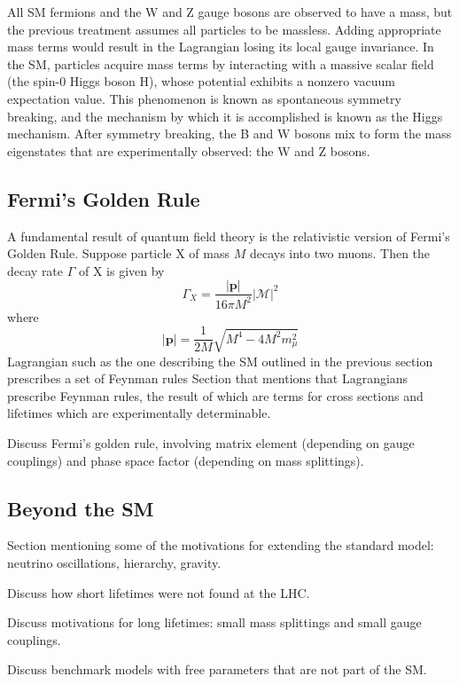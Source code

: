 All SM fermions and the W and Z gauge bosons are observed to have a mass, but the previous treatment assumes all particles to be massless.
Adding appropriate mass terms would result in the Lagrangian losing its local gauge invariance.
In the SM, particles acquire mass terms by interacting with a massive scalar field (the spin-0 Higgs boson H), whose potential exhibits a nonzero vacuum expectation value.
This phenomenon is known as spontaneous symmetry breaking, and the mechanism by which it is accomplished is known as the Higgs mechanism.
After symmetry breaking, the B and W bosons mix to form the mass eigenstates that are experimentally observed: the W and Z bosons.

\subsection{Fermi's Golden Rule}
A fundamental result of quantum field theory is the relativistic version of Fermi's Golden Rule.
Suppose particle X of mass $M$ decays into two muons. Then the decay rate $\Gamma$ of X is given by
\begin{equation}
  \Gamma_X = \frac{|\mathbf{p}|}{16\pi M^2}\left|\mathcal{M}\right|^2 
  \label{eq:sm:fermi}
\end{equation}
where 
\begin{equation}
  |\mathbf{p}| = \frac{1}{2M}\sqrt{M^4 - 4M^2m_\mu^2}
  \label{eq:sm:p}
\end{equation}
Lagrangian such as the one describing the SM outlined in the previous section prescribes a set of Feynman rules
Section that mentions that Lagrangians prescribe Feynman rules, the result of which are terms for cross sections and lifetimes which are experimentally determinable.

Discuss Fermi's golden rule, involving matrix element (depending on gauge couplings) and phase space factor (depending on mass splittings).

\subsection{Beyond the SM}
Section mentioning some of the motivations for extending the standard model: neutrino oscillations, hierarchy, gravity.

Discuss how short lifetimes were not found at the LHC.

Discuss motivations for long lifetimes: small mass splittings and small gauge couplings.

Discuss benchmark models with free parameters that are not part of the SM.
